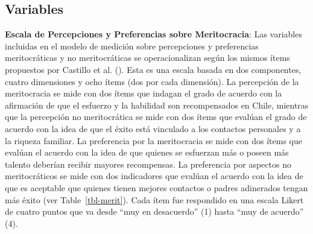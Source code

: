 \documentclass[
  12pt,
]{article}
\begin{document}
\subsection{Variables}\label{variables}

\textbf{Escala de Percepciones y Preferencias sobre Meritocracia}: Las
variables incluidas en el modelo de medición sobre percepciones y
preferencias meritocráticas y no meritocráticas se operacionalizan según
los mismos ítems propuestos por Castillo et al.
(). Esta es una
escala basada en dos componentes, cuatro dimensiones y ocho ítems (dos
por cada dimensión). La percepción de la meritocracia se mide con dos
ítems que indagan el grado de acuerdo con la afirmación de que el
esfuerzo y la habilidad son recompensados en Chile, mientras que la
percepción no meritocrática se mide con dos ítems que evalúan el grado
de acuerdo con la idea de que el éxito está vinculado a los contactos
personales y a la riqueza familiar. La preferencia por la meritocracia
se mide con dos ítems que evalúan el acuerdo con la idea de que quienes
se esfuerzan más o poseen más talento deberían recibir mayores
recompensas. La preferencia por aspectos no meritocráticos se mide con
dos indicadores que evalúan el acuerdo con la idea de que es aceptable
que quienes tienen mejores contactos o padres adinerados tengan más
éxito (ver Table~\ref{tbl-merit}). Cada ítem fue respondido en una
escala Likert de cuatro puntos que va desde ``muy en desacuerdo'' (1)
hasta ``muy de acuerdo'' (4).
\end{document}
